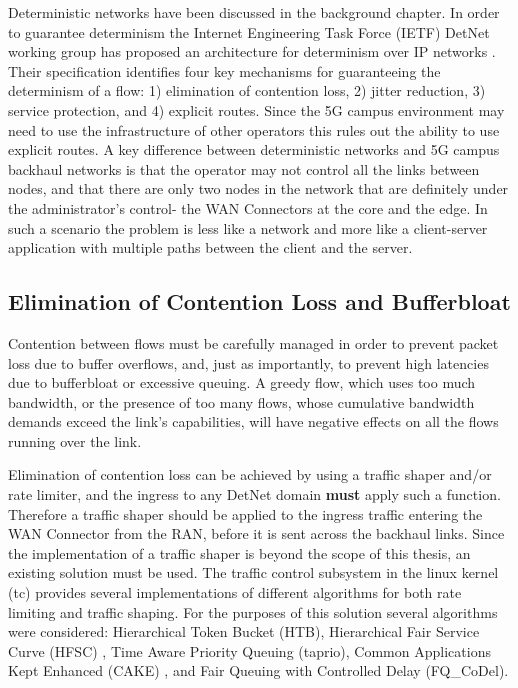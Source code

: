 Deterministic networks have been discussed in the background chapter. In order to guarantee determinism the Internet Engineering Task Force (IETF) DetNet working group has proposed an architecture for determinism over IP networks \cite{detnet-arch}. Their specification identifies four key mechanisms for guaranteeing the determinism of a flow: 1) elimination of contention loss, 2) jitter reduction, 3) service protection, and 4) explicit routes. Since the 5G campus environment may need to use the infrastructure of other operators this rules out the ability to use explicit routes. A key difference between deterministic networks and 5G campus backhaul networks is that the operator may not control all the links between nodes, and that there are only two nodes in the network that are definitely under the administrator's control- the WAN Connectors at the core and the edge. In such a scenario the problem is less like a network and more like a client-server application with multiple paths between the client and the server.

\subsection{Elimination of Contention Loss and Bufferbloat}

Contention between flows must be carefully managed in order to prevent packet loss due to buffer overflows, and, just as importantly, to prevent high latencies due to bufferbloat or excessive queuing. A greedy flow, which uses too much bandwidth, or the presence of too many flows, whose cumulative bandwidth demands exceed the link's capabilities, will have negative effects on all the flows running over the link.

Elimination of contention loss can be achieved by using a traffic shaper and/or rate limiter, and the ingress to any DetNet domain \textbf{must} apply such a function. Therefore a traffic shaper should be applied to the ingress traffic entering the WAN Connector from the RAN, before it is sent across the backhaul links. Since the implementation of a traffic shaper is beyond the scope of this thesis, an existing solution must be used. The traffic control subsystem in the linux kernel (tc) provides several implementations of different algorithms for both rate limiting and traffic shaping. For the purposes of this solution several algorithms were considered: Hierarchical Token Bucket (HTB), Hierarchical Fair Service Curve (HFSC) \cite{stoica1997hierarchical}, Time Aware Priority Queuing (taprio), Common Applications Kept Enhanced (CAKE) \cite{hoiland2018piece}, and Fair Queuing with Controlled Delay (FQ\_CoDel).

